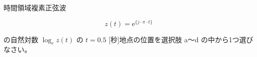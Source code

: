 時間領域複素正弦波 

\[
z(t) =  \textrm{e}^{\{ j \cdot \pi \cdot t \}}
\]

\bigskip の自然対数 $\log_e z(t)$ の $t = 0.5$ [秒]地点の位置を選択肢 a〜d の中から1つ選びなさい。
